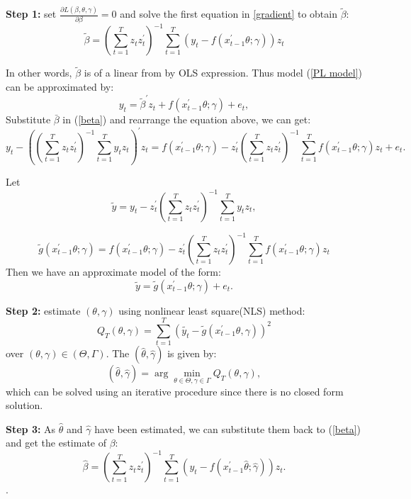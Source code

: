 \documentclass[a4paper,12pt,times,numbered,print,index]{report}
\numberwithin{equation}{section}
\begin{document}
\textbf{Step 1:} set $\frac{\partial L(\beta, \theta, \gamma)}{\partial \beta} = 0$ and solve the first equation in \ref{gradient} to obtain $\tilde{\beta}$:
\begin{equation}
\tilde{\beta} = \left( \sum_{t=1}^{T}z_t z_t^{\prime}\right)^{-1}\sum_{t=1}^{T}\left( y_t - f\left( x_{t-1}^{\prime }\theta; \gamma\right)\right) z_t
\label{beta}
\end{equation}

In other words, $\tilde{\beta}$ is of a linear from by OLS expression. Thus model (\ref{PL model}) can be approximated by:
$$
y_t = \tilde{\beta}^{\prime} z_t + f\left( x_{t-1}^{\prime }\theta; \gamma\right) +e_{t},
$$
Substitute $\bar{\beta}$ in (\ref{beta}) and rearrange the equation above, we can get:
$$
y_t - \left( \left( \sum_{t=1}^{T}z_t z_t^{\prime}\right)^{-1} \sum_{t=1}^{T}y_t z_t \right) ^{\prime} z_t = f\left( x_{t-1}^{\prime }\theta; \gamma\right) - z_t^{\prime} \left( \sum_{t=1}^{T}z_t z_t^{\prime}\right)^{-1} \sum_{t=1}^{T} f\left( x_{t-1}^{\prime }\theta; \gamma\right) z_t + e_t.
$$

Let  
$$\tilde{y} = y_t -  z_t^{\prime}  \left( \sum_{t=1}^{T}z_t z_t^{\prime}\right)^{-1} \sum_{t=1}^{T}y_t z_t, $$ 

$$\tilde{g} ( x_{t-1}^{\prime }\theta; \gamma) = f\left( x_{t-1}^{\prime }\theta; \gamma\right) - z_t^{\prime} \left( \sum_{t=1}^{T}z_t z_t^{\prime}\right)^{-1} \sum_{t=1}^{T} f\left( x_{t-1}^{\prime }\theta; \gamma\right) z_t$$ 
Then we have an approximate model of the form:
\begin{equation}
\tilde{y} = \tilde{g}\left( x_{t-1}^{\prime }\theta; \gamma\right) + e_t.
\label{trans_model}
\end{equation}

\textbf{Step 2: } estimate $(\theta, \gamma)$ using nonlinear least square(NLS) method:
$$
Q_{T}(\theta, \gamma)=\sum_{t=1}^{T}\left(\tilde{y_{t}}-\tilde{g}\left(x_{t-1}^{\prime} \theta, \gamma\right)\right)^{2}
$$
over $(\theta, \gamma) \in (\Theta, \Gamma)$.
The $(\hat{\theta}, \hat{\gamma})$ is given by:
\begin{equation*}
\left( \widehat{\theta},\widehat{\gamma}\right) =\arg \min_{\theta \in \Theta
	,\gamma \in \Gamma }Q_{T}\left( \theta ,\gamma \right),  \label{nls_c3}
\end{equation*}%
which can be solved using an iterative procedure since there is no closed form solution. 

\textbf{Step 3: } As $\hat{\theta}$ and $\hat{\gamma}$ have been estimated, we can substitute them back to (\ref{beta}) and get the estimate of $\beta$:
$$
 \hat{\beta} = \left( \sum_{t=1}^{T}z_t z_t^{\prime}\right)^{-1}\sum_{t=1}^{T}\left( y_t- f\left( x_{t-1}^{\prime }\hat{\theta}; \hat{\gamma}\right)\right) z_t.
$$.
\end{document}
